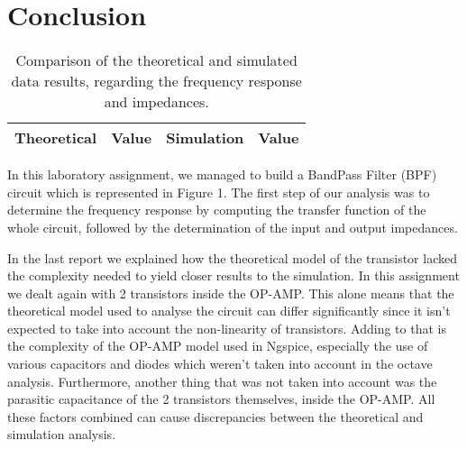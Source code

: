 \section{Conclusion}
\label{sec:conclusion}
\par
\begin{table}[!h]
  \centering
  \begin{tabular}{c c c c}
    \hline    
    {\bf Theoretical} & {\bf Value} & {\bf Simulation} & {\bf Value}\\ \hline
     
  \end{tabular}
  \caption{Comparison of the theoretical and simulated data results, regarding the frequency response and impedances.}
  \label{tab:comp}
\end{table}

In this laboratory assignment, we managed to build a BandPass Filter (BPF) circuit which is represented in Figure 1. The first step of our analysis was to determine the frequency response by computing the transfer function of the whole circuit, followed by the determination of the input and output impedances.

In the last report we explained how the theoretical model of the transistor lacked the complexity needed to yield closer results to the simulation. In this assignment we dealt again with 2 transistors inside the OP-AMP. This alone means that the theoretical model used to analyse the circuit can differ significantly since it isn't expected to take into account the non-linearity of transistors. Adding to that is the complexity of the OP-AMP model used in Ngspice, especially the use of various capacitors and diodes which weren't taken into account in the octave analysis. Furthermore, another thing that was not taken into account was the parasitic capacitance of the 2 transistors themselves, inside the OP-AMP. All these factors combined can cause discrepancies between the theoretical and simulation analysis.


